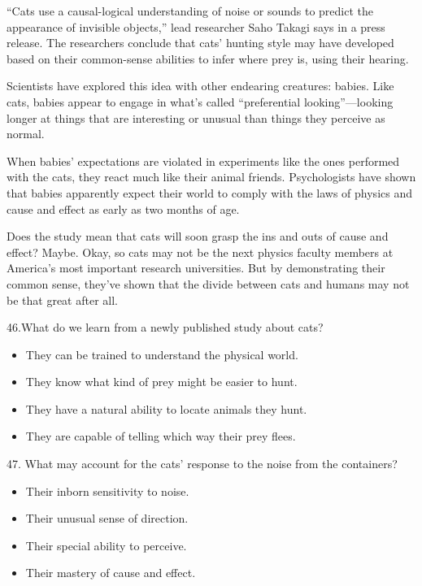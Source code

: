 \documentclass[UTF8,11pt]{ctexart}
\begin{document}
“Cats use a causal-logical understanding of noise or sounds to predict the appearance of invisible objects,” lead researcher Saho Takagi says in a press release. The researchers conclude that cats’ hunting style may have developed based on their common-sense abilities to infer where prey is, using their hearing.


Scientists have explored this idea with other endearing creatures: babies. Like cats, babies appear to engage in what’s called “preferential looking”—looking longer at things that are interesting or unusual than things they perceive as normal.


When babies’ expectations are violated in experiments like the ones performed with the cats, they react much like their animal friends. Psychologists have shown that babies apparently expect their world to comply with the laws of physics and cause and effect as early as two months of age.


Does the study mean that cats will soon grasp the ins and outs of cause and effect? Maybe. Okay, so cats may not be the next physics faculty members at America’s most important research universities. But by demonstrating their common sense, they’ve shown that the divide between cats and humans may not be that great after all.


46.What do we learn from a newly published study about cats?


\begin{itemize}[leftmargin=2em,itemsep=.2em,topsep=.4em]\item[A.] They can be trained to understand the physical world.
\item[B.] They know what kind of prey might be easier to hunt.
\item[C.] They have a natural ability to locate animals they hunt.
\item[D.] They are capable of telling which way their prey flees.
\end{itemize}

47. What may account for the cats’ response to the noise from the containers?


\begin{itemize}[leftmargin=2em,itemsep=.2em,topsep=.4em]\item[A.] Their inborn sensitivity to noise.
\item[B.] Their unusual sense of direction.
\item[C.] Their special ability to perceive.
\item[D.] Their mastery of cause and effect.
\end{itemize}
\end{document}
